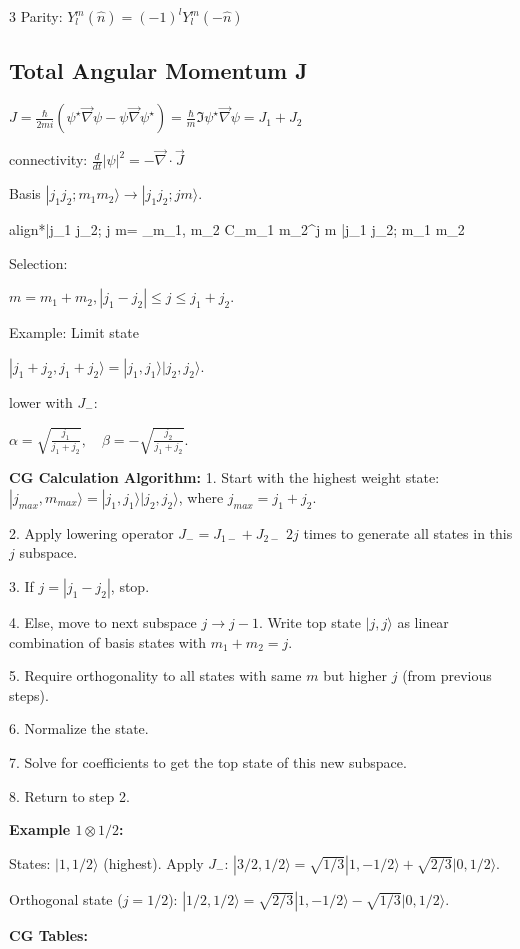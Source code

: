 \documentclass[10pt,a4paper]{article}
\newcommand{\important}[1]{\begin{empheq}[box=\fbox]{align*}#1\end{empheq}}
\begin{document}
\begin{multicols*}{3}
Parity: $Y_{l}^m(\hat{n}) = (-1)^l Y_l^m(-\hat{n})$

\subsection*{Total Angular Momentum J}
$J=\frac{\hbar}{2mi}(\psi^\star\vec{\nabla}\psi-\psi\vec{\nabla}\psi^\star)=\frac{\hbar}{m}\Im{\psi^\star\vec{\nabla}\psi} = J_1 +J_2$

connectivity: $\frac{d}{dt}|\psi|^2=-\vec{\nabla}\cdot\vec{J}$

Basis $|j_1 j_2; m_1 m_2\rangle \to |j_1 j_2; j m\rangle$.
\important{|j_1 j_2; j m\rangle = \sum_{m_1, m_2} C_{m_1 m_2}^{j m} |j_1 j_2; m_1 m_2\rangle}
Selection: 

$m = m_1 + m_2, |j_1 - j_2| \le j \le j_1 + j_2$.

Example: Limit state 

$|j_1+j_2, j_1+j_2\rangle = |j_1, j_1\rangle |j_2, j_2\rangle$. 

lower with $J_-$:

$\alpha = \sqrt{\frac{j_1}{j_1+j_2}}, \quad \beta = -\sqrt{\frac{j_2}{j_1+j_2}}$.

\textbf{CG Calculation Algorithm:}
1. Start with the highest weight state: $|j_{max}, m_{max}\rangle = |j_1, j_1\rangle |j_2, j_2\rangle$, where $j_{max} = j_1+j_2$.

2. Apply lowering operator $J_- = J_{1-} + J_{2-}$ $2j$ times to generate all states in this $j$ subspace.

3. If $j = |j_1 - j_2|$, stop.

4. Else, move to next subspace $j \to j-1$. Write top state $|j, j\rangle$ as linear combination of basis states with $m_1+m_2=j$.

5. Require orthogonality to all states with same $m$ but higher $j$ (from previous steps).

6. Normalize the state.

7. Solve for coefficients to get the top state of this new subspace.

8. Return to step 2.

\textbf{Example $1 \otimes 1/2$:}

States: $|1, 1/2\rangle$ (highest). Apply $J_-$:
$|3/2, 1/2\rangle = \sqrt{1/3}|1, -1/2\rangle + \sqrt{2/3}|0, 1/2\rangle$.

Orthogonal state ($j=1/2$): $|1/2, 1/2\rangle = \sqrt{2/3}|1, -1/2\rangle - \sqrt{1/3}|0, 1/2\rangle$.

\textbf{CG Tables:}


\end{multicols*}
\end{document}
